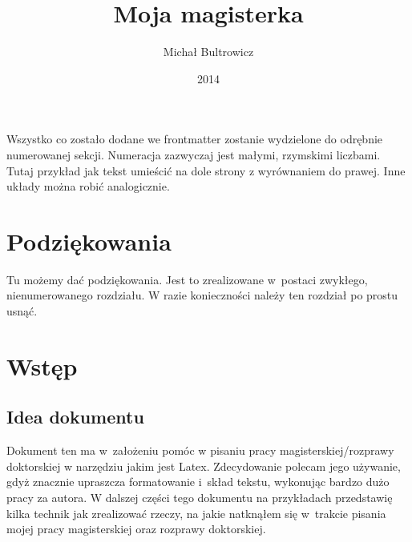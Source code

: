 \documentclass[twoside,a4paper]{book}
\title{Moja magisterka}
\author{Michał Bultrowicz}
\date{2014}
\begin{document}
\frontmatter
\maketitle

\tableofcontents

\newpage
\null
\vfill
\begin{flushright}
  Wszystko co zostało dodane we frontmatter zostanie wydzielone do odrębnie numerowanej sekcji. Numeracja zazwyczaj jest małymi, rzymskimi liczbami. Tutaj przykład jak tekst umieścić na dole strony z wyrównaniem do prawej. Inne układy można robić analogicznie.
\end{flushright}

\chapter*{Podziękowania}
Tu możemy dać podziękowania. Jest to zrealizowane w~postaci zwykłego, nienumerowanego rozdziału. W razie konieczności należy ten rozdział po prostu usnąć.

\mainmatter

\chapter{Wstęp}
\section{Idea dokumentu}

Dokument ten ma w~założeniu pomóc w pisaniu pracy magisterskiej/rozprawy doktorskiej w narzędziu jakim jest Latex. Zdecydowanie polecam jego używanie, gdyż znacznie upraszcza formatowanie i~skład tekstu, wykonując bardzo dużo pracy za autora. W dalszej części tego dokumentu na przykładach przedstawię kilka technik jak zrealizować rzeczy, na jakie natknąłem się w~trakcie pisania mojej pracy magisterskiej oraz rozprawy doktorskiej.
\end{document}
